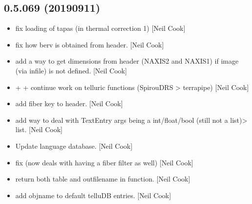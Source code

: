 \documentclass[a4paper,10pt,english]{report}
\begin{document}
\subsection{0.5.069 (2019\sphinxhyphen{}09\sphinxhyphen{}11)}
\label{\detokenize{misc/changelog:id93}}\begin{itemize}
\item {} 
 \sphinxhyphen{} fix loading of tapas (in thermal
correction 1) {[}Neil Cook{]}

\item {} 
 \sphinxhyphen{} fix how berv is obtained from header. {[}Neil
Cook{]}

\item {} 
 \sphinxhyphen{} add a way to get dimensions from header
(NAXIS2 and NAXIS1) if image (via infile) is not defined. {[}Neil Cook{]}

\item {} 
 +  +
 \sphinxhyphen{} continue work on telluric functions
(SpirouDRS \textendash{}\textgreater{} terrapipe) {[}Neil Cook{]}

\item {} 
 \sphinxhyphen{} add fiber key to header. {[}Neil
Cook{]}

\item {} 
 \sphinxhyphen{} add way to deal with TextEntry args being a
int/float/bool (still not a list)\textendash{}\textgreater{} list. {[}Neil Cook{]}

\item {} 
Update language database. {[}Neil Cook{]}

\item {} 
 \sphinxhyphen{} fix  (now deals with having a fiber filter
as well) {[}Neil Cook{]}

\item {} 
 \sphinxhyphen{} return both table and outfilename in 
function. {[}Neil Cook{]}

\item {} 
 \sphinxhyphen{} add objname to
default telluDB entries. {[}Neil Cook{]}


\end{itemize}
\end{document}
